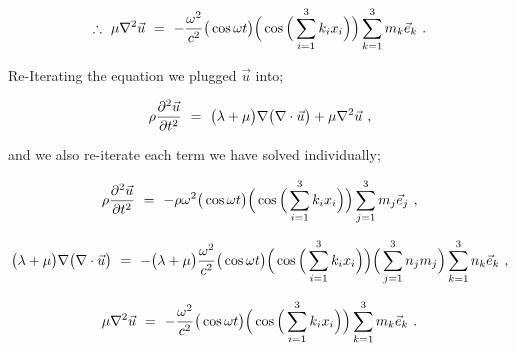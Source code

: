 \documentclass{article}
\begin{document}
\begin{equation} \label{eb-eq-1-167}
\therefore \hspace{0.125cm} \mu \nabla{}^2 \vec{u} \hspace{0.125cm} = \hspace{0.125cm} - \frac{\omega{}^2}{c^2} \big( \cos{ \omega t } \big) \Big( \cos \Big( \sum_{i = 1}^{3} k_i x_i \Big) \Big) \sum_{k = 1}^{3} m_k \vec{e}_k \hspace{0.125cm}  .
\end{equation}

Re-Iterating the equation we plugged \begin{math} \vec{u} \end{math} into;

\begin{equation} \label{eb-eq-1-168}
\rho \frac{\partial{}^2 \vec{u}}{\partial{ t }^2} \hspace{0.125cm} = \hspace{0.125cm} \big( \lambda + \mu \big) \nabla \big( \nabla \cdot \vec{u} \big) + \mu \nabla{}^2 \vec{u} \hspace{0.125cm}  , 
\end{equation}

and we also re-iterate each term we have solved individually;

\begin{equation} \label{eb-eq-1-169}
\rho \frac{\partial{}^2 \vec{u}}{\partial{ t }^2} \hspace{0.125cm} = \hspace{0.125cm} - \rho \omega{}^2 \big( \cos{ \omega t } \big) \Big( \cos \Big( \sum_{i = 1}^{3} k_i x_i \Big) \Big) \sum_{j = 1}^{3} m_j \vec{e}_j \hspace{0.125cm} ,
\end{equation}

\begin{equation} \label{eb-eq-1-170}
\big( \lambda + \mu \big) \nabla \big( \nabla \cdot \vec{u} \big) \hspace{0.125cm} = \hspace{0.125cm} - \big( \lambda + \mu \big)  \frac{\omega{}^2}{c^2} \big( \cos{ \omega t } \big) \Big( \cos \Big( \sum_{i = 1}^{3} k_i x_i \Big) \Big) \Big( \sum_{j = 1}^{3} n_j m_j \Big) \sum_{k = 1}^{3} n_k \vec{e}_k \hspace{0.125cm} , 
\end{equation}

\begin{equation} \label{eb-eq-1-171}
\mu \nabla{}^2 \vec{u} \hspace{0.125cm} = \hspace{0.125cm} - \frac{\omega{}^2}{c^2} \big( \cos{ \omega t } \big) \Big( \cos \Big( \sum_{i = 1}^{3} k_i x_i \Big) \Big) \sum_{k = 1}^{3} m_k \vec{e}_k \hspace{0.125cm}  .
\end{equation}
\end{document}

